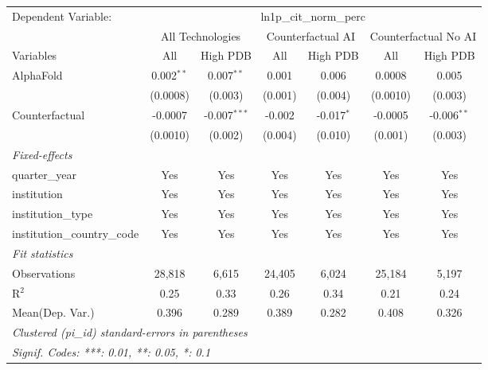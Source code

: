 \begingroup
\centering
\begin{tabular}{lcccccc}
   \tabularnewline \midrule \midrule
   Dependent Variable: & \multicolumn{6}{c}{ln1p\_cit\_norm\_perc}\\
 & \multicolumn{2}{c}{All Technologies} & \multicolumn{2}{c}{Counterfactual AI} & \multicolumn{2}{c}{Counterfactual No AI} \\
\cmidrule(lr){1-1}\cmidrule(lr){2-3} \cmidrule(lr){4-5} \cmidrule(lr){6-7}
Variables & \multicolumn{1}{c}{All} & \multicolumn{1}{c}{High PDB} & \multicolumn{1}{c}{All} & \multicolumn{1}{c}{High PDB} & \multicolumn{1}{c}{All} & \multicolumn{1}{c}{High PDB} \\
\cmidrule(lr){1-1}\cmidrule(lr){2-2} \cmidrule(lr){3-3} \cmidrule(lr){4-4} \cmidrule(lr){5-5} \cmidrule(lr){6-6} \cmidrule(lr){7-7}
   AlphaFold                    & 0.002$^{**}$ & 0.007$^{**}$   & 0.001   & 0.006        & 0.0008   & 0.005\\   
                                & (0.0008)     & (0.003)        & (0.001) & (0.004)      & (0.0010) & (0.003)\\   
   Counterfactual               & -0.0007      & -0.007$^{***}$ & -0.002  & -0.017$^{*}$ & -0.0005  & -0.006$^{**}$\\   
                                & (0.0010)     & (0.002)        & (0.004) & (0.010)      & (0.001)  & (0.003)\\   
   \midrule
   \emph{Fixed-effects}\\
   quarter\_year                & Yes          & Yes            & Yes     & Yes          & Yes      & Yes\\  
   institution                  & Yes          & Yes            & Yes     & Yes          & Yes      & Yes\\  
   institution\_type            & Yes          & Yes            & Yes     & Yes          & Yes      & Yes\\  
   institution\_country\_code   & Yes          & Yes            & Yes     & Yes          & Yes      & Yes\\  
   \midrule
   \emph{Fit statistics}\\
   Observations                 & 28,818       & 6,615          & 24,405  & 6,024        & 25,184   & 5,197\\  
   R$^2$                        & 0.25         & 0.33           & 0.26    & 0.34         & 0.21     & 0.24\\  
Mean(Dep. Var.) & 0.396 & 0.289 & 0.389 & 0.282 & 0.408 & 0.326 \\
   \midrule \midrule
   \multicolumn{7}{l}{\emph{Clustered (pi\_id) standard-errors in parentheses}}\\
   \multicolumn{7}{l}{\emph{Signif. Codes: ***: 0.01, **: 0.05, *: 0.1}}\\
\end{tabular}
\par\endgroup
